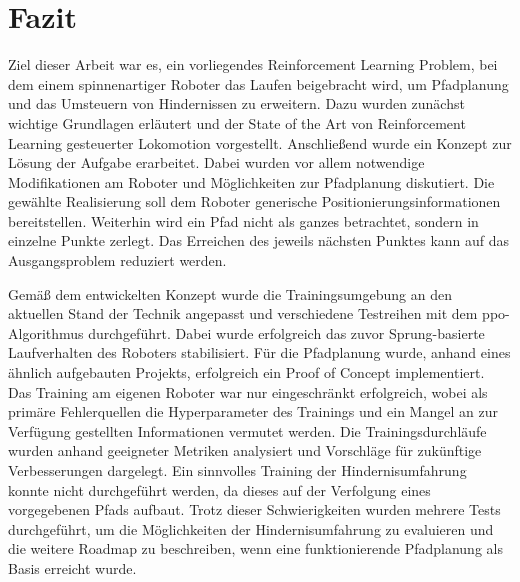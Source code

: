 \chapter{Fazit}
Ziel dieser Arbeit war es, ein vorliegendes Reinforcement Learning Problem, bei dem einem spinnenartiger Roboter das Laufen beigebracht wird, um Pfadplanung und das Umsteuern von Hindernissen zu erweitern.
Dazu wurden zunächst wichtige Grundlagen erläutert und der State of the Art von Reinforcement Learning gesteuerter Lokomotion vorgestellt.
Anschließend wurde ein Konzept zur Lösung der Aufgabe erarbeitet.
Dabei wurden vor allem notwendige Modifikationen am Roboter und Möglichkeiten zur Pfadplanung diskutiert.
Die gewählte Realisierung soll dem Roboter generische Positionierungsinformationen bereitstellen.
Weiterhin wird ein Pfad nicht als ganzes betrachtet, sondern in einzelne Punkte zerlegt.
Das Erreichen des jeweils nächsten Punktes kann auf das Ausgangsproblem reduziert werden.

Gemäß dem entwickelten Konzept wurde die Trainingsumgebung an den aktuellen Stand der Technik angepasst und verschiedene Testreihen mit dem \acl{ppo}-Algorithmus durchgeführt.
Dabei wurde erfolgreich das zuvor Sprung-basierte Laufverhalten des Roboters stabilisiert.
Für die Pfadplanung wurde, anhand eines ähnlich aufgebauten Projekts, erfolgreich ein Proof of Concept implementiert.
Das Training am eigenen Roboter war nur eingeschränkt erfolgreich, wobei als primäre Fehlerquellen die Hyperparameter des Trainings und ein Mangel an zur Verfügung gestellten Informationen vermutet werden.
Die Trainingsdurchläufe wurden anhand geeigneter Metriken analysiert und Vorschläge für zukünftige Verbesserungen dargelegt.
Ein sinnvolles Training der Hindernisumfahrung konnte nicht durchgeführt werden, da dieses auf der Verfolgung eines vorgegebenen Pfads aufbaut.
Trotz dieser Schwierigkeiten wurden mehrere Tests durchgeführt, um die Möglichkeiten der Hindernisumfahrung zu evaluieren und die weitere Roadmap zu beschreiben, wenn eine funktionierende Pfadplanung als Basis erreicht wurde.
